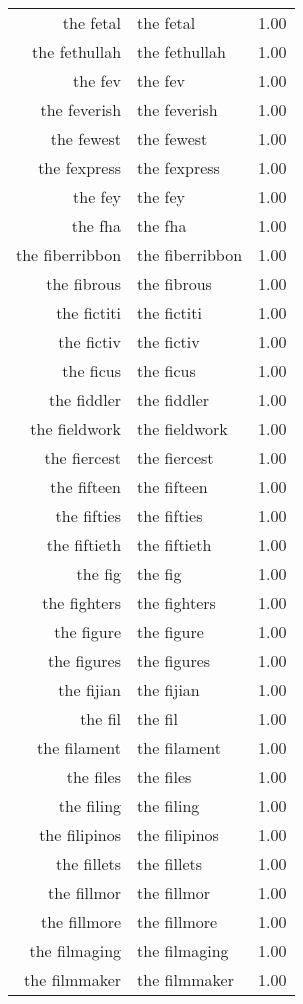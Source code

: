 \begin{table}[ht]
\begin{tabular}{rlr}
  the fetal & the fetal & 1.00 \\ 
  the fethullah & the fethullah & 1.00 \\ 
  the fev & the fev & 1.00 \\ 
  the feverish & the feverish & 1.00 \\ 
  the fewest & the fewest & 1.00 \\ 
  the fexpress & the fexpress & 1.00 \\ 
  the fey & the fey & 1.00 \\ 
  the fha & the fha & 1.00 \\ 
  the fiberribbon & the fiberribbon & 1.00 \\ 
  the fibrous & the fibrous & 1.00 \\ 
  the fictiti & the fictiti & 1.00 \\ 
  the fictiv & the fictiv & 1.00 \\ 
  the ficus & the ficus & 1.00 \\ 
  the fiddler & the fiddler & 1.00 \\ 
  the fieldwork & the fieldwork & 1.00 \\ 
  the fiercest & the fiercest & 1.00 \\ 
  the fifteen & the fifteen & 1.00 \\ 
  the fifties & the fifties & 1.00 \\ 
  the fiftieth & the fiftieth & 1.00 \\ 
  the fig & the fig & 1.00 \\ 
  the fighters & the fighters & 1.00 \\ 
  the figure & the figure & 1.00 \\ 
  the figures & the figures & 1.00 \\ 
  the fijian & the fijian & 1.00 \\ 
  the fil & the fil & 1.00 \\ 
  the filament & the filament & 1.00 \\ 
  the files & the files & 1.00 \\ 
  the filing & the filing & 1.00 \\ 
  the filipinos & the filipinos & 1.00 \\ 
  the fillets & the fillets & 1.00 \\ 
  the fillmor & the fillmor & 1.00 \\ 
  the fillmore & the fillmore & 1.00 \\ 
  the filmaging & the filmaging & 1.00 \\ 
  the filmmaker & the filmmaker & 1.00 \\ 

\end{tabular}
\end{table}
